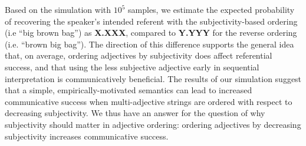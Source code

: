 \documentclass[12pt]{article}
\begin{document}
Based on the simulation with $10^5$ samples, we estimate the expected probability of recovering the speaker's intended referent with the subjectivity-based ordering (i.e ``big brown bag'') as \textbf{X.XXX}, compared to \textbf{Y.YYY} for the reverse ordering (i.e. ``brown big bag''). The direction of this difference supports the general idea that, on average,  ordering adjectives by subjectivity does affect referential success, and that using the less subjective adjective early in sequential interpretation is communicatively beneficial. 
The results of our simulation suggest that a simple, empirically-motivated semantics can lead to increased communicative success when multi-adjective strings are ordered with respect to decreasing subjectivity. We thus have an answer for the question of why subjectivity should matter in adjective ordering: ordering adjectives by decreasing subjectivity increases communicative success. 


{\scriptsize
 

}
\end{document}
